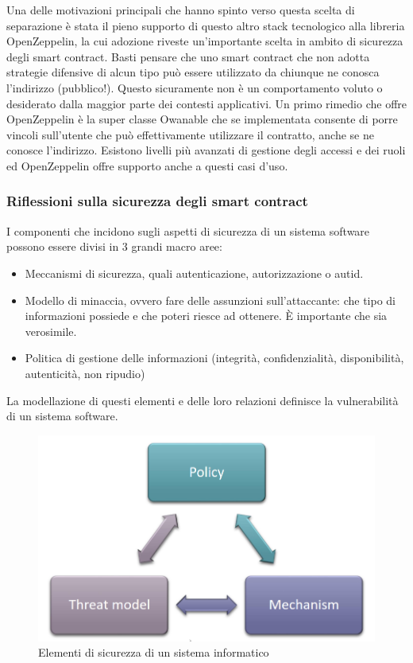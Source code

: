 \documentclass[a4paper,11pt]{article}
\begin{document}
Una delle motivazioni principali che hanno spinto verso questa scelta di separazione è stata il pieno supporto di questo altro stack tecnologico alla libreria OpenZeppelin, la cui adozione riveste un'importante scelta in ambito di sicurezza degli smart contract. Basti pensare che uno smart contract che non adotta strategie difensive di alcun tipo può essere utilizzato da chiunque ne conosca l'indirizzo (pubblico!). Questo sicuramente non è un comportamento voluto o desiderato dalla maggior parte dei contesti applicativi. Un primo rimedio che offre OpenZeppelin è la super classe Owanable che se implementata consente di porre vincoli sull'utente che può effettivamente utilizzare il contratto, anche se ne conosce l'indirizzo. Esistono livelli più avanzati di gestione degli accessi e dei ruoli ed OpenZeppelin offre supporto anche a questi casi d'uso.

\subsubsection{Riflessioni sulla sicurezza degli smart contract} \label{par:openzeppelin}

I componenti che incidono sugli aspetti di sicurezza di un sistema software possono essere divisi in 3 grandi macro aree: \cite{slideMetodi}

\begin{itemize}
  \item Meccanismi di sicurezza, quali autenticazione, autorizzazione o autid.
  \item Modello di minaccia, ovvero fare delle assunzioni sull'attaccante: che tipo di informazioni possiede e che poteri riesce ad ottenere. È importante che sia verosimile.
  \item Politica di gestione delle informazioni (integrità, confidenzialità, disponibilità, autenticità, non ripudio)
\end{itemize}

La modellazione di questi elementi e delle loro relazioni definisce la vulnerabilità di un sistema software.

\begin{figure}
  \centering
  \includegraphics[width=0.5\linewidth]{img/securityComponent.png}
  \caption{Elementi di sicurezza di un sistema informatico \cite{slideMetodi}}
  \label{fig:sec1}
\end{figure}
\end{document}
